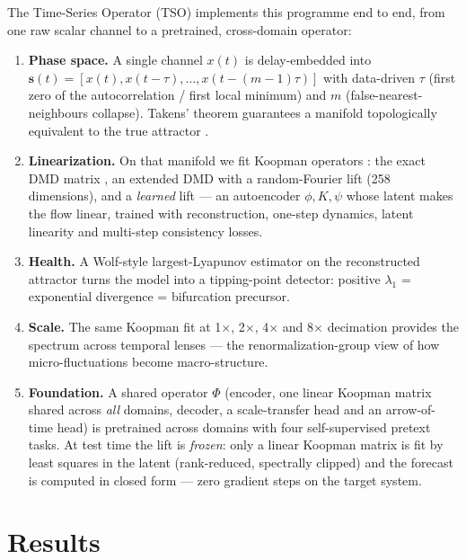 \documentclass[11pt]{article}
\begin{document}
The Time-Series Operator (TSO) implements this programme end to end,
from one raw scalar channel to a pretrained, cross-domain operator:

\begin{enumerate}
\item \textbf{Phase space.} A single channel $x(t)$ is delay-embedded into
$\mathbf{s}(t)=[x(t),x(t-\tau),\dots,x(t-(m-1)\tau)]$ with data-driven
$\tau$ (first zero of the autocorrelation / first local minimum) and $m$
(false-nearest-neighbours collapse). Takens' theorem guarantees a manifold
topologically equivalent to the true attractor \cite{takens1981}.
\item \textbf{Linearization.} On that manifold we fit Koopman operators
\cite{koopman1931,mezić2005}: the exact DMD matrix \cite{schmid2010}, an
extended DMD with a random-Fourier lift (258 dimensions), and a \emph{learned}
lift --- an autoencoder $\phi, K, \psi$ whose latent makes the flow linear,
trained with reconstruction, one-step dynamics, latent linearity and
multi-step consistency losses.
\item \textbf{Health.} A Wolf-style largest-Lyapunov estimator
\cite{wolf1985} on the reconstructed attractor turns the model into a
tipping-point detector: positive $\lambda_1$ = exponential divergence =
bifurcation precursor.
\item \textbf{Scale.} The same Koopman fit at 1$\times$, 2$\times$, 4$\times$
and 8$\times$ decimation provides the spectrum across temporal lenses --- the
renormalization-group view of how micro-fluctuations become macro-structure.
\item \textbf{Foundation.} A shared operator $\Phi$ (encoder, one linear
Koopman matrix shared across \emph{all} domains, decoder, a scale-transfer
head and an arrow-of-time head) is pretrained across domains with four
self-supervised pretext tasks. At test time the lift is \emph{frozen}: only a
linear Koopman matrix is fit by least squares in the latent (rank-reduced,
spectrally clipped) and the forecast is computed in closed form --- zero
gradient steps on the target system.
\end{enumerate}

\section{Results}
\label{sec:results}
\end{document}
